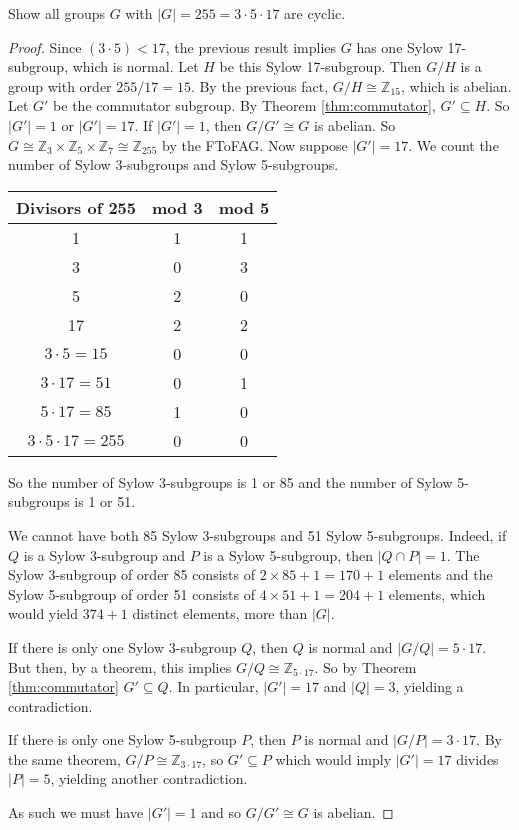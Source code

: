 \begin{example}
	Show all groups $G$ with $|G|=255=3\cdot 5\cdot 17$ are cyclic.

	\begin{proof}
		Since $(3\cdot 5)<17$, the previous result implies $G$ has one Sylow 17-subgroup, which is normal. Let $H$ be this Sylow 17-subgroup. Then $G/H$ is a group with order $255/17=15$. By the previous fact, $G/H\cong\mathbb Z_{15}$, which is abelian. Let $G'$ be the commutator subgroup. By Theorem \ref{thm:commutator}, $G'\subseteq H$. So $|G'|=1$ or $|G'|=17$. If $|G'|=1$, then $G/G'\cong G$ is abelian. So $G\cong\mathbb Z_3\times\mathbb Z_5\times\mathbb Z_7\cong\mathbb Z_{255}$ by the FToFAG. Now suppose $|G'|=17$. We count the number of Sylow 3-subgroups and Sylow 5-subgroups.

		\begin{center}
		\begin{tabular}{c c c}
			Divisors of 255 & mod 3 & mod 5\\ \hline
			1 & 1 & 1\\
			3 & 0 & 3\\
			5 & 2 & 0\\
			17 & 2 & 2\\
			$3\cdot 5=15$ & 0 & 0\\
			$3\cdot 17=51$ & 0 & 1\\
			$5\cdot 17=85$ & 1 & 0\\
			$3\cdot 5\cdot 17=255$ & 0 & 0
		\end{tabular}
		\end{center}

		So the number of Sylow 3-subgroups is 1 or 85 and the number of Sylow 5-subgroups is 1 or 51.

		We cannot have both 85 Sylow 3-subgroups and 51 Sylow 5-subgroups. Indeed, if $Q$ is a Sylow 3-subgroup and $P$ is a Sylow 5-subgroup, then $|Q\cap P|=1$. The Sylow 3-subgroup of order 85 consists of $2\times 85+1=170+1$ elements and the Sylow 5-subgroup of order 51 consists of $4\times 51+1=204+1$ elements, which would yield $374+1$ distinct elements, more than $|G|$.

		If there is only one Sylow 3-subgroup $Q$, then $Q$ is normal and $|G/Q|=5\cdot 17$. But then, by a theorem, this implies $G/Q\cong\mathbb Z_{5\cdot 17}$. So by Theorem \ref{thm:commutator} $G'\subseteq Q$. In particular, $|G'|=17$ and $|Q|=3$, yielding a contradiction.

		If there is only one Sylow 5-subgroup $P$, then $P$ is normal and $|G/P|=3\cdot 17$. By the same theorem, $G/P\cong\mathbb Z_{3\cdot 17}$, so $G'\subseteq P$ which would imply $|G'|=17$ divides $|P|=5$, yielding another contradiction.

		As such we must have $|G'|=1$ and so $G/G'\cong G$ is abelian.
	\end{proof}
\end{example}